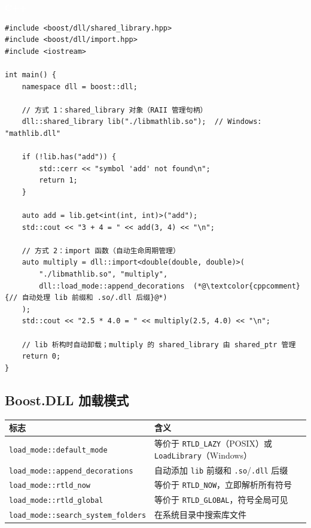 \documentclass[12pt,a4paper,fontset=fandol]{ctexbook}
\newcommand{\cpplabel}{%
  \begin{tcolorbox}[enhanced,colback=cppheadbg,colframe=cppheadbg,
    arc=1mm,boxrule=0mm,left=6pt,right=6pt,top=2pt,bottom=2pt,
    halign=left,oversize]
    \textcolor{white}{\small\bfseries C++}
  \end{tcolorbox}\vspace{-4pt}}
\begin{document}
\cpplabel
\begin{lstlisting}[style=cppstyle]
#include <boost/dll/shared_library.hpp>
#include <boost/dll/import.hpp>
#include <iostream>

int main() {
    namespace dll = boost::dll;

    // 方式 1：shared_library 对象（RAII 管理句柄）
    dll::shared_library lib("./libmathlib.so");  // Windows: "mathlib.dll"

    if (!lib.has("add")) {
        std::cerr << "symbol 'add' not found\n";
        return 1;
    }

    auto add = lib.get<int(int, int)>("add");
    std::cout << "3 + 4 = " << add(3, 4) << "\n";

    // 方式 2：import 函数（自动生命周期管理）
    auto multiply = dll::import<double(double, double)>(
        "./libmathlib.so", "multiply",
        dll::load_mode::append_decorations  (*@\textcolor{cppcomment}{// 自动处理 lib 前缀和 .so/.dll 后缀}@*)
    );
    std::cout << "2.5 * 4.0 = " << multiply(2.5, 4.0) << "\n";

    // lib 析构时自动卸载；multiply 的 shared_library 由 shared_ptr 管理
    return 0;
}
\end{lstlisting}

\subsection{Boost.DLL 加载模式}

\begin{longtable}{l>{\raggedright\arraybackslash}p{7cm}}
\toprule
\textbf{标志} & \textbf{含义} \\
\midrule
\texttt{load\_\allowbreak{}mode::default\_\allowbreak{}mode} & 等价于 \texttt{RTLD\_LAZY}（POSIX）或 \texttt{LoadLibrary}（Windows） \\
\texttt{load\_\allowbreak{}mode::append\_\allowbreak{}decorations} & 自动添加 \texttt{lib} 前缀和 \texttt{.so}/\allowbreak{}\texttt{.dll} 后缀 \\
\texttt{load\_mode::rtld\_now} & 等价于 \texttt{RTLD\_NOW}，立即解析所有符号 \\
\texttt{load\_mode::rtld\_global} & 等价于 \texttt{RTLD\_GLOBAL}，符号全局可见 \\
\texttt{load\_mode::search\_system\_folders} & 在系统目录中搜索库文件 \\
\bottomrule
\end{longtable}
\end{document}
